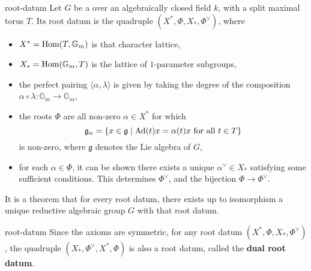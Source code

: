 \begin{example}{root-datum}
    Let $G$ be a  over an algebraically closed field $k$, with a split maximal torus $T$. Its root datum is the quadruple $(X^*, \Phi, X_*, \Phi^\vee)$, where
    \begin{itemize}
        \item $X^* = \text{Hom}(T, \mathbb{G}_m)$ is that character lattice,
        \item $X_* = \text{Hom}(\mathbb{G}_m, T)$ is the lattice of $1$-parameter subgroups,
        \item the perfect pairing $\langle \alpha, \lambda \rangle$ is given by taking the degree of the composition $\alpha \circ \lambda : \mathbb{G}_m \to \mathbb{G}_m$,
        \item the roots $\Phi$ are all non-zero $\alpha \in X^*$ for which
        \[ \mathfrak{g}_\alpha = \{ x \in \mathfrak{g} \;|\; \textup{Ad}(t) x = \alpha(t) x \textup{ for all } t \in T \} \]
        is non-zero, where $\mathfrak{g}$ denotes the Lie algebra of $G$,
        \item for each $\alpha \in \Phi$, it can be shown there exists a unique $\alpha^\vee \in X_*$ satisfying some sufficient conditions. This determines $\Phi^\vee$, and the bijection $\Phi \to \Phi^\vee$.
    \end{itemize}
    
    It is a theorem that for every root datum, there exists up to isomorphism a unique reductive algebraic group $G$ with that root datum.
\end{example}

\begin{example}{root-datum}
    Since the axioms are symmetric, for any root datum $(X^*, \Phi, X_*, \Phi^\vee)$, the quadruple $(X_*, \Phi^\vee, X^*, \Phi)$ is also a root datum, called the \textbf{dual root datum}.
\end{example}


